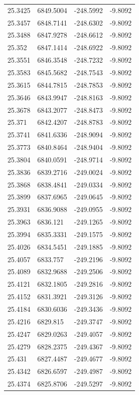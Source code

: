 \begin{table}[H]
\begin{tabular}{llll}
25.3425 & 6849.5004 & -248.5992 & -9.8092 \\
25.3457 & 6848.7141 & -248.6302 & -9.8092 \\
25.3488 & 6847.9278 & -248.6612 & -9.8092 \\
25.352 & 6847.1414 & -248.6922 & -9.8092 \\
25.3551 & 6846.3548 & -248.7232 & -9.8092 \\
25.3583 & 6845.5682 & -248.7543 & -9.8092 \\
25.3615 & 6844.7815 & -248.7853 & -9.8092 \\
25.3646 & 6843.9947 & -248.8163 & -9.8092 \\
25.3678 & 6843.2077 & -248.8473 & -9.8092 \\
25.371 & 6842.4207 & -248.8783 & -9.8092 \\
25.3741 & 6841.6336 & -248.9094 & -9.8092 \\
25.3773 & 6840.8464 & -248.9404 & -9.8092 \\
25.3804 & 6840.0591 & -248.9714 & -9.8092 \\
25.3836 & 6839.2716 & -249.0024 & -9.8092 \\
25.3868 & 6838.4841 & -249.0334 & -9.8092 \\
25.3899 & 6837.6965 & -249.0645 & -9.8092 \\
25.3931 & 6836.9088 & -249.0955 & -9.8092 \\
25.3963 & 6836.121 & -249.1265 & -9.8092 \\
25.3994 & 6835.3331 & -249.1575 & -9.8092 \\
25.4026 & 6834.5451 & -249.1885 & -9.8092 \\
25.4057 & 6833.757 & -249.2196 & -9.8092 \\
25.4089 & 6832.9688 & -249.2506 & -9.8092 \\
25.4121 & 6832.1805 & -249.2816 & -9.8092 \\
25.4152 & 6831.3921 & -249.3126 & -9.8092 \\
25.4184 & 6830.6036 & -249.3436 & -9.8092 \\
25.4216 & 6829.815 & -249.3747 & -9.8092 \\
25.4247 & 6829.0263 & -249.4057 & -9.8092 \\
25.4279 & 6828.2375 & -249.4367 & -9.8092 \\
25.431 & 6827.4487 & -249.4677 & -9.8092 \\
25.4342 & 6826.6597 & -249.4987 & -9.8092 \\
25.4374 & 6825.8706 & -249.5297 & -9.8092 \\

\end{tabular}
\end{table}
